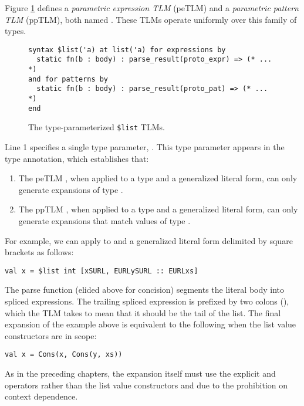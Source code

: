 
Figure \ref{fig:petsm-list} defines a \emph{parametric expression TLM} (peTLM) and a \emph{parametric pattern TLM} (ppTLM), both named . These TLMs operate uniformly over this family of types.
\begin{figure}[h]
\begin{lstlisting}
syntax $list('a) at list('a) for expressions by 
  static fn(b : body) : parse_result(proto_expr) => (* ... *)
and for patterns by 
  static fn(b : body) : parse_result(proto_pat) => (* ... *) 
end
\end{lstlisting}
\caption{The type-parameterized \texttt{\$list} TLMs.}
\label{fig:petsm-list}
\end{figure}

Line 1 specifies a single type parameter, . This type parameter appears in the type annotation, which establishes that:
\begin{enumerate}
\item The peTLM , when applied to a type  and a generalized literal form, can only generate expansions of type .
\item The ppTLM , when applied to a type  and a generalized literal form, can only generate expansions that match values of type .
\end{enumerate}
For example, we can apply  to  and a generalized literal form delimited by square brackets as follows:
\begin{lstlisting}[numbers=none]
val x = $list int [xSURL, EURLySURL :: EURLxs]
\end{lstlisting}
The parse function (elided above for concision) segments the literal body into  spliced expressions. The trailing spliced expression is prefixed by two colons (), which the TLM takes to mean that it should be the tail of the list. The final expansion of the example above is equivalent to the following when the list value constructors are in scope:
\begin{lstlisting}[numbers=none]
val x = Cons(x, Cons(y, xs))
\end{lstlisting}
As in the preceding chapters, the expansion itself must use the explicit  and  operators rather than the list value constructors  and  due to the prohibition on context dependence.

